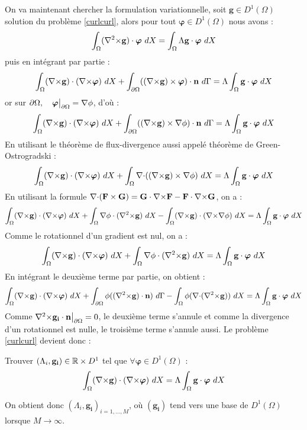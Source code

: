 On va maintenant chercher la formulation variationnelle, soit $\mathbf{g}\in D^1(\Omega)$ solution du problème \ref{curlcurl}, alors pour tout $\bm{\varphi}\in D^1(\Omega)$ nous avons :
\[ \int_\Omega ({\nabla^2\times} \mathbf{g})\cdot\bm{\varphi}\ dX = \int_\Omega\Lambda \mathbf{g}\cdot\bm{\varphi}\ dX \]
puis en intégrant par partie :
\[ \int_\Omega ({\nabla\times} \mathbf{g})\cdot({\nabla\times}\bm{\varphi})\ dX + \int_{\partial\Omega} (({\nabla\times} \mathbf{g})\times \bm{\varphi})\cdot \mathbf{n}\ d\Gamma = \Lambda\int_\Omega \mathbf{g}\cdot\bm{\varphi}\ dX \]
or sur $\partial\Omega,\quad \bm{\varphi}{\big\rvert_{\partial\Omega}}={\nabla}\phi$, d'où :
\[ \int_\Omega ({\nabla\times} \mathbf{g})\cdot({\nabla\times}\bm{\varphi})\ dX + \int_{\partial\Omega} (({\nabla\times} \mathbf{g})\times {\nabla}\phi)\cdot \mathbf{n}\ d\Gamma = \Lambda\int_\Omega \mathbf{g}\cdot\bm{\varphi}\ dX \]
En utilisant le théorème de flux-divergence aussi appelé théorème de Green-Ostrogradski :
\[ \int_\Omega ({\nabla\times} \mathbf{g})\cdot({\nabla\times}\bm{\varphi})\ dX + \int_\Omega {\nabla\cdot}(({\nabla\times} \mathbf{g})\times {\nabla}\phi)\ dX = \Lambda\int_\Omega \mathbf{g}\cdot\bm{\varphi}\ dX \]
En utilisant la formule ${\nabla\cdot}(\mathbf{F}\times \mathbf{G}) = \mathbf{G}\cdot {\nabla\times} \mathbf{F} - \mathbf{F}\cdot {\nabla\times} \mathbf{G}$, on a :
\[ \int_\Omega (\rot \mathbf{g})\cdot(\rot\bm{\varphi})\ dX + \int_\Omega \grad\phi\cdot(\rott \mathbf{g})\ dX -\int_\Omega (\rot \mathbf{g})\cdot (\rot\grad\phi)\ dX  = \Lambda\int_\Omega \mathbf{g}\cdot\bm{\varphi}\ dX \]
Comme le rotationnel d'un gradient est nul, on a :
\[ \int_\Omega ({\nabla\times} \mathbf{g})\cdot({\nabla\times}\bm{\varphi})\ dX + \int_\Omega {\nabla}\phi\cdot({\nabla^2\times} \mathbf{g})\ dX  = \Lambda\int_\Omega \mathbf{g}\cdot\bm{\varphi}\ dX \]
En intégrant le deuxième terme par partie, on obtient :
\[ \int_\Omega ({\nabla\times} \mathbf{g})\cdot({\nabla\times}\bm{\varphi})\ dX + \int_{\partial\Omega} \phi(({\nabla^2\times} \mathbf{g})\cdot \mathbf{n})\ d\Gamma - \int_\Omega \phi({\nabla\cdot}({\nabla^2\times} \mathbf{g}))\ dX  = \Lambda\int_\Omega \mathbf{g}\cdot\bm{\varphi}\ dX \]
Comme ${\nabla^2\times}  \mathbf{g_i}\cdot \mathbf{n}{\big\rvert_{\partial\Omega}} = 0$, le deuxième terme s'annule et comme la divergence d'un rotationnel est nulle, le troisième terme s'annule aussi. Le problème \ref{curlcurl} devient donc :
\begin{pb}\label{fveigen}
Trouver $(\Lambda_i,\mathbf{g_i})\in {\mathbb{R}}\times D^1$ tel que $\forall \bm{\varphi}\in D^1(\Omega)$ :
\begin{equation*}
\int_\Omega ({\nabla\times} \mathbf{g})\cdot({\nabla\times}\bm{\varphi})\ dX = \Lambda\int_\Omega \mathbf{g}\cdot\bm{\varphi}\ dX
\end{equation*}
\end{pb}
On obtient donc $(\Lambda_i,\mathbf{g_i})_{i=1,\dots,M}$, où $(\mathbf{g_i})$ tend vers une base de $D^1(\Omega)$ lorsque $M\rightarrow \infty$.
